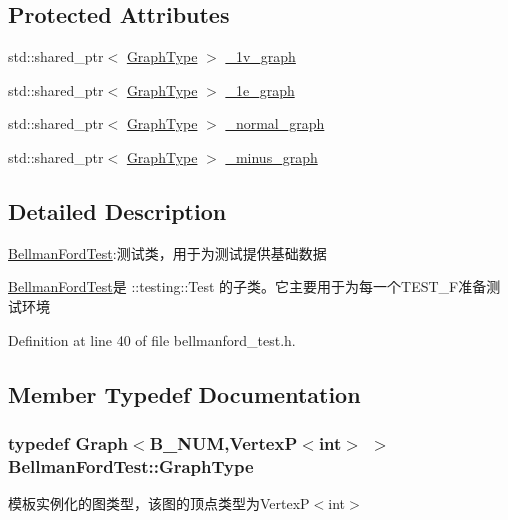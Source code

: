 \subsection*{Protected Attributes}
\begin{DoxyCompactItemize}
\item 
std\+::shared\+\_\+ptr$<$ \hyperlink{class_bellman_ford_test_a81e8794fcae1d04ceb23de43c5944829}{Graph\+Type} $>$ \hyperlink{class_bellman_ford_test_a1e228fdc8f10f3932dfa93969b22740a}{\+\_\+1v\+\_\+graph}
\item 
std\+::shared\+\_\+ptr$<$ \hyperlink{class_bellman_ford_test_a81e8794fcae1d04ceb23de43c5944829}{Graph\+Type} $>$ \hyperlink{class_bellman_ford_test_a13720ba4e090b0accf73283c15a7f0ec}{\+\_\+1e\+\_\+graph}
\item 
std\+::shared\+\_\+ptr$<$ \hyperlink{class_bellman_ford_test_a81e8794fcae1d04ceb23de43c5944829}{Graph\+Type} $>$ \hyperlink{class_bellman_ford_test_a80eda504410ddbef790a30a0d4049185}{\+\_\+normal\+\_\+graph}
\item 
std\+::shared\+\_\+ptr$<$ \hyperlink{class_bellman_ford_test_a81e8794fcae1d04ceb23de43c5944829}{Graph\+Type} $>$ \hyperlink{class_bellman_ford_test_a179a0a6d2ae9d6a2404ef5e5f9a06869}{\+\_\+minus\+\_\+graph}
\end{DoxyCompactItemize}


\subsection{Detailed Description}
\hyperlink{class_bellman_ford_test}{Bellman\+Ford\+Test}\+:测试类，用于为测试提供基础数据 

{\ttfamily \hyperlink{class_bellman_ford_test}{Bellman\+Ford\+Test}}是 {\ttfamily \+::testing\+::\+Test} 的子类。它主要用于为每一个{\ttfamily T\+E\+S\+T\+\_\+\+F}准备测试环境 

Definition at line 40 of file bellmanford\+\_\+test.\+h.



\subsection{Member Typedef Documentation}
\hypertarget{class_bellman_ford_test_a81e8794fcae1d04ceb23de43c5944829}{}
\subsubsection[{Graph\+Type}]{\setlength{\rightskip}{0pt plus 5cm}typedef {\bf Graph}$<$B\+\_\+\+N\+U\+M,{\bf Vertex\+P}$<$int$>$ $>$ {\bf Bellman\+Ford\+Test\+::\+Graph\+Type}}\label{class_bellman_ford_test_a81e8794fcae1d04ceb23de43c5944829}
模板实例化的图类型，该图的顶点类型为{\ttfamily Vertex\+P$<$int$>$} 

